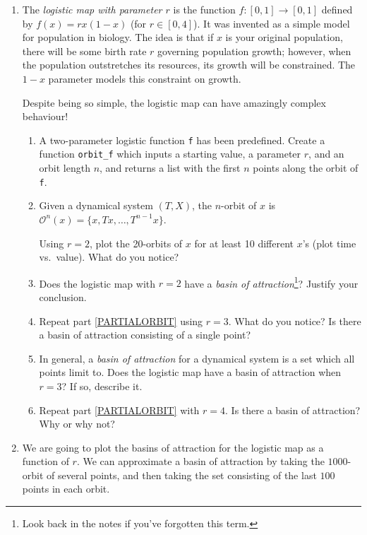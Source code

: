 \documentclass[letter]{article}
\begin{document}
	\begin{enumerate}
		\item The \emph{logistic map with parameter $r$} is the function $f:[0,1]\to[0,1]$ defined by $f(x)=rx(1-x)$ (for $r\in[0,4]$).
			It was invented as a simple model for population in biology. The idea is that if $x$ is your original population,
			there will be some birth rate $r$ governing population growth; however, when the population outstretches its
			resources, its growth will be constrained. The $1-x$ parameter models this constraint on growth.

			Despite being so simple, the logistic map can have amazingly complex behaviour!

		\begin{enumerate}
			\item A two-parameter logistic function {\tt f} has been predefined. Create a function \verb|orbit_f| which inputs
				a starting value, a parameter $r$, and an orbit length $n$, and returns a list with the first
				$n$ points along the orbit of {\tt f}.

			\item \label{PARTIALORBIT}Given a dynamical system $(T,X)$, the $n$-orbit of $x$ is $\mathcal O^n(x)=\{x,Tx,\ldots, T^{n-1}x\}$.

				Using $r=2$, plot the 20-orbits of $x$ for at least 10 different $x$'s (plot time vs.~value). What do you notice?
			\item Does the logistic map with $r=2$ have a \emph{basin of attraction}\footnote{ Look back in the notes
				if you've forgotten this term.}? Justify your conclusion.
			\item Repeat part \ref{PARTIALORBIT} using $r=3$. What do you notice? Is there a basin of attraction consisting of a single point?

			\item In general, a \emph{basin of attraction} for a dynamical system is a set which all points limit to.
				Does the logistic map have a basin of attraction when $r=3$? If so, describe it.

			\item Repeat part \ref{PARTIALORBIT} with $r=4$. Is there a basin of attraction? Why or why not?
		\end{enumerate}

		\item We are going to plot the basins of attraction for the logistic map as a function of $r$. We can approximate a basin
			of attraction by taking the $1000$-orbit of several points, and then taking the set consisting of the last $100$ points
			in each orbit.


\end{enumerate}
\end{document}
